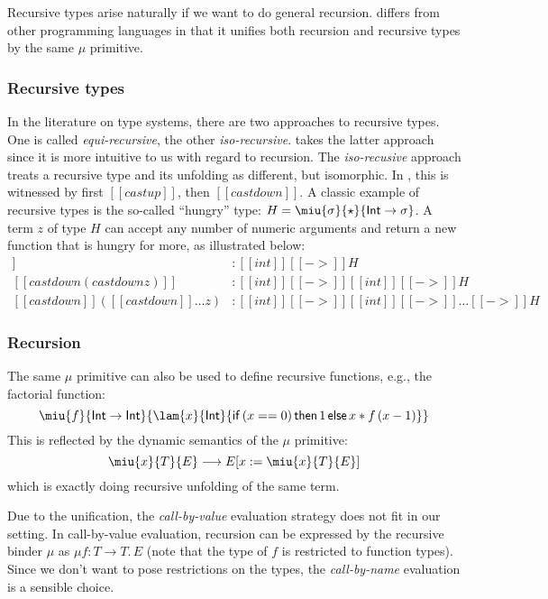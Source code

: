 Recursive types arise naturally if we want to do general recursion. \name differs from other programming languages in that it unifies both recursion and recursive types by the same $\mu$ primitive.

\subsubsection{Recursive types}

In the literature on type systems, there are two approaches to recursive types. One is called \emph{equi-recursive}, the other \emph{iso-recursive}. \name takes the latter approach since it is more intuitive to us with regard to recursion. The \emph{iso-recusive} approach treats a recursive type and its unfolding as different, but isomorphic. In \name, this is witnessed by first $[[castup]]$, then $[[castdown]]$. A classic example of recursive types is the so-called ``hungry'' type: $H = \miu{\sigma}{\star}{\mathsf{Int} \rightarrow \sigma}$. A term $z$ of type $H$ can accept any number of numeric arguments and return a new function that is hungry for more, as illustrated below:
\begin{align*}
[[castdown z]] &: [[int]][[->]]H  \\
[[castdown(castdown z)]] &: [[int]][[->]][[int]][[->]]H \\
[[castdown]]([[castdown]] \dots z) &: [[int]][[->]][[int]][[->]]\dots[[->]]H
\end{align*}

\subsubsection{Recursion}

The same $\mu$ primitive can also be used to define recursive functions, e.g., the factorial function: \[\miu{f}{\mathsf{Int} \rightarrow \mathsf{Int}}{\lam{x}{\mathsf{Int}}{\mathsf{if}\,(x == 0)\,\mathsf{then}\,1\,\mathsf{else}\,x * f\,(x - 1)}}\] This is reflected by the dynamic semantics of the $\mu$ primitive:
\[\miu{x}{T}{E} \longrightarrow E[x:=\miu{x}{T}{E}]\]
which is exactly doing recursive unfolding of the same term.

Due to the unification, the \emph{call-by-value} evaluation strategy does not fit in our setting. In call-by-value evaluation, recursion can be expressed by the recursive binder $\mu$ as $\mu f : T \rightarrow T.\, E$ (note that the type of $f$ is restricted to function types). Since we don't want to pose restrictions on the types, the \emph{call-by-name}  evaluation is a sensible choice.

